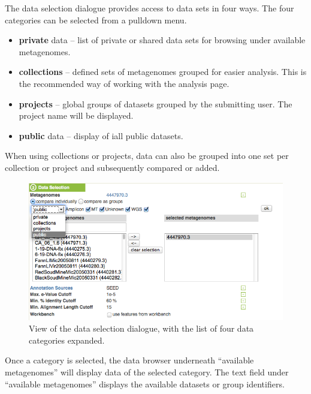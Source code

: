 \documentclass[12pt,fullpage]{report}
\begin{document}

The data selection dialogue provides access to data sets in four ways. The four categories can be selected from a pulldown menu.

\begin{itemize}
\item \textbf{private} data --
list of private or shared data sets for browsing under available metagenomes.

\item \textbf{collections} --
defined sets of metagenomes grouped for easier analysis. This is the recommended way of working with the analysis page.

\item \textbf{projects} --
global groups of datasets grouped by the submitting user. The project name will be displayed.

\item \textbf{public} data --
display of iall public datasets.

\end{itemize}

When using collections or projects, data can also be grouped into one set per collection or project and subsequently compared or added.


\begin{figure}
\begin{center}
\includegraphics[width=6in]{Images/Data-selection-expanded.png}
\end{center}
\caption{
View of the data selection dialogue, with the list of four data categories expanded.
}
\label{fig:Data-selection-expanded}
\end{figure}

Once a category is selected, the data browser underneath ``available metagenomes'' will display data of the selected category. The text field under ``available metagenomes'' displays the available datasets or group identifiers.
\end{document}
